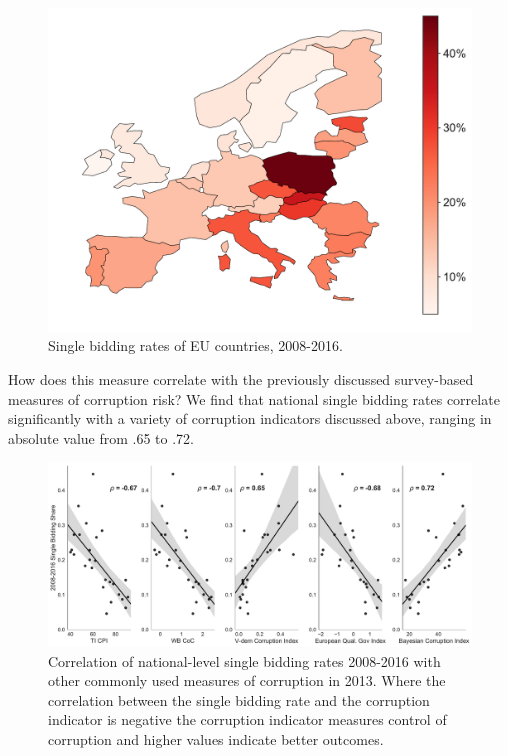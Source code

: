 \begin{figure}[!ht]
\centering
\includegraphics[width=.9\textwidth]{images/ted_networks/eu_sb_map.pdf}
\caption[Single bidding rates of EU countries.]{Single bidding rates of EU countries, 2008-2016.}
\label{fig:eu_sb_rates}
\end{figure}


How does this measure correlate with the previously discussed survey-based measures of corruption risk? We find that national single bidding rates correlate significantly with a variety of corruption indicators discussed above, ranging in absolute value from .65 to .72.

\begin{figure}[!ht]
\centering
\includegraphics[width=\textwidth]{images/ted_networks/sb_corruption_correlations.pdf}
\caption[Correlates of national single bidding]{Correlation of national-level single bidding rates 2008-2016 with other commonly used measures of corruption in 2013. Where the correlation between the single bidding rate and the corruption indicator is negative the corruption indicator measures control of corruption and higher values indicate better outcomes.}
\label{fig:ted_sb_corr}
\end{figure}


